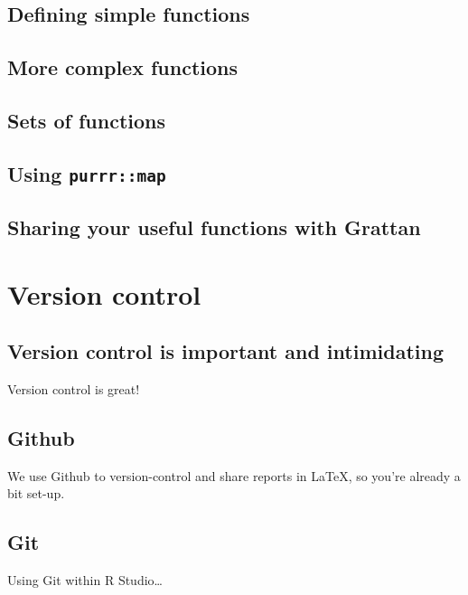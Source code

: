 \documentclass[]{book}
\begin{document}
\hypertarget{defining-simple-functions}{%
\section{Defining simple functions}\label{defining-simple-functions}}

\hypertarget{more-complex-functions}{%
\section{More complex functions}\label{more-complex-functions}}

\hypertarget{sets-of-functions}{%
\section{Sets of functions}\label{sets-of-functions}}

\hypertarget{using-purrrmap}{%
\section{\texorpdfstring{Using \texttt{purrr::map}}{Using purrr::map}}\label{using-purrrmap}}

\hypertarget{sharing-your-useful-functions-with-grattan}{%
\section{Sharing your useful functions with Grattan}\label{sharing-your-useful-functions-with-grattan}}

\hypertarget{version-control}{%
\chapter{Version control}\label{version-control}}

\hypertarget{version-control-is-important-and-intimidating}{%
\section{Version control is important and intimidating}\label{version-control-is-important-and-intimidating}}

Version control is great!

\hypertarget{github}{%
\section{Github}\label{github}}

We use Github to version-control and share reports in LaTeX, so you're already a bit set-up.

\hypertarget{git}{%
\section{Git}\label{git}}

Using Git within R Studio\ldots{}


\end{document}
